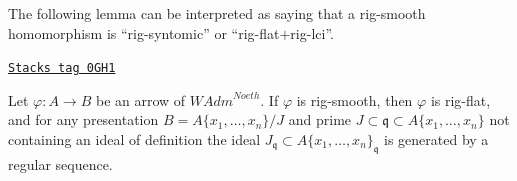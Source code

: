 The following lemma can be interpreted as saying that a rig-smooth
homomorphism is ``rig-syntomic'' or ``rig-flat$+$rig-lci''.

\begin{lemma}
\label{restricted-lemma-rig-smooth-rig-flat}
\href{https://stacks.math.columbia.edu/tag/0GH1}{\texttt{Stacks tag 0GH1}}

Let $\varphi : A \to B$ be an arrow of $\textit{WAdm}^{Noeth}$.
If $\varphi$ is rig-smooth, then $\varphi$ is rig-flat, and
for any presentation $B = A\{x_1, \ldots, x_n\}/J$
and prime $J \subset \mathfrak q \subset A\{x_1, \ldots, x_n\}$
not containing an ideal of definition the ideal
$J_\mathfrak q \subset A\{x_1, \ldots, x_n\}_\mathfrak q$
is generated by a regular sequence.
\end{lemma}

